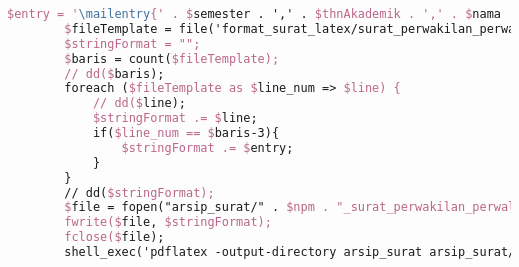 \begin{lstlisting}[language=tex,basicstyle=\tiny,caption=HistorysuratController.php]
        $entry = '\mailentry{' . $semester . ',' . $thnAkademik . ',' . $nama . ',' . $prodi . ',' . $npm . ',' . $namaWakil . ',' . $prodiWakil . ',' . $npmWakil . ',' . $dosenWali . ',' . $alasan . ',' . $kodeMK1 . ',' . $matkul1 . ',' . $sks1 . ',' . $kodeMK2 . ',' . $matkul2 . ',' . $sks2 . ',' . $kodeMK3 . ',' . $matkul3 . ',' . $sks3 . ',' . $kodeMK4 . ',' . $matkul4 . ',' . $sks4 . ',' . $kodeMK5 . ',' . $matkul5 . ',' . $sks5 . ',' . $kodeMK6 . ',' . $matkul6 . ',' . $sks6 . ',' . $kodeMK7 . ',' . $matkul7 . ',' . $sks7 . ',' . $tanggal . '}';
        $fileTemplate = file('format_surat_latex/surat_perwakilan_perwalian_7mk.tex');
        $stringFormat = "";
        $baris = count($fileTemplate);
        // dd($baris);
        foreach ($fileTemplate as $line_num => $line) {
            // dd($line);
            $stringFormat .= $line;
            if($line_num == $baris-3){
                $stringFormat .= $entry;
            }
        }
        // dd($stringFormat);
        $file = fopen("arsip_surat/" . $npm . "_surat_perwakilan_perwalian_7mk.tex", "w");
        fwrite($file, $stringFormat);
        fclose($file);
        shell_exec('pdflatex -output-directory arsip_surat arsip_surat/' . $npm . '_surat_perwakilan_perwalian_7mk.tex');


\end{lstlisting}
